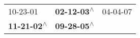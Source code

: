 \begin{supertabular}{lll}
                  10-23-01\textsuperscript{} &  \textbf{02-12-03\textsuperscript{$\wedge$}} &  04-04-07\textsuperscript{} \\
 \textbf{11-21-02\textsuperscript{$\wedge$}} &  \textbf{09-28-05\textsuperscript{$\wedge$}} &                             \\
\end{supertabular}
